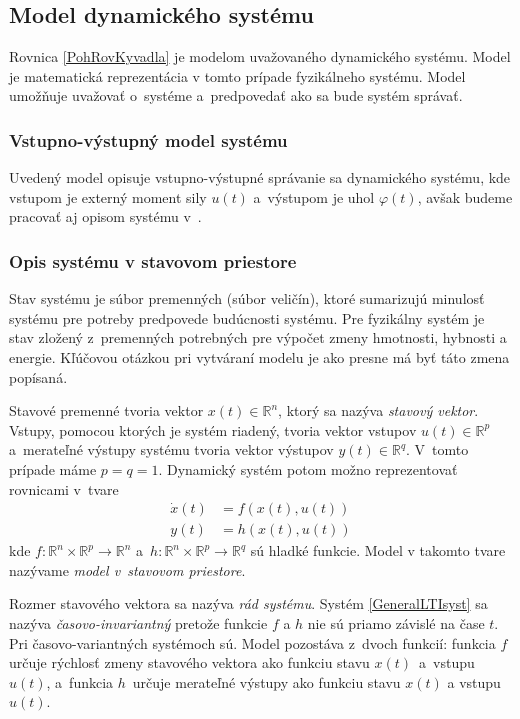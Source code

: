 \documentclass[a4paper, 10pt, ]{article}
\begin{document}
\subsection{Model dynamického systému}

Rovnica \eqref{PohRovKyvadla} je modelom uvažovaného dynamického systému. Model je matematická reprezentácia v tomto prípade fyzikálneho systému. Model umožňuje uvažovať o~systéme a~predpovedať ako sa bude systém správať.

\subsubsection{Vstupno-výstupný model systému}
    
Uvedený model opisuje vstupno-výstupné správanie sa dynamického systému, kde vstupom je externý moment sily $u(t)$ a~výstupom je uhol $\varphi(t)$, avšak budeme pracovať aj opisom systému v~.


\subsubsection{Opis systému v stavovom priestore}

Stav systému je súbor premenných (súbor veličín), ktoré sumarizujú minulosť systému pre potreby predpovede budúcnosti systému. Pre fyzikálny systém je stav zložený z~premenných potrebných pre výpočet zmeny hmotnosti, hybnosti a energie. Kľúčovou otázkou pri vytváraní modelu je ako presne má byť táto zmena popísaná.

Stavové premenné tvoria vektor $x(t) \in  \mathbb{R}^n$, ktorý sa nazýva \emph{stavový vektor}. Vstupy, pomocou ktorých je systém riadený, tvoria vektor vstupov $u(t) \in \mathbb{R}^p$ a~merateľné výstupy systému tvoria vektor výstupov $y(t) \in \mathbb{R}^q$. V~tomto prípade máme $p = q = 1$. Dynamický systém  potom možno reprezentovať rovnicami v~tvare
\begin{subequations} \label{GeneralLTIsyst}
\begin{align}
	\dot{x}(t) &= f(x(t),u(t)) \\
	y(t) &= h(x(t),u(t))
\end{align}
\end{subequations}
kde $f: \mathbb{R}^n \times \mathbb{R}^p \rightarrow \mathbb{R}^n$ a~$h: \mathbb{R}^n \times \mathbb{R}^p \rightarrow \mathbb{R}^q$ sú hladké funkcie. Model v takomto tvare nazývame \emph{model v~stavovom priestore}.

Rozmer stavového vektora sa nazýva \emph{rád systému}. Systém \eqref{GeneralLTIsyst} sa nazýva \emph{časovo-invariantný} pretože funkcie $f$ a $h$ nie sú priamo závislé na čase $t$. Pri časovo-variantných systémoch sú. Model pozostáva z~dvoch funkcií: funkcia $f$ určuje rýchlosť zmeny stavového vektora ako funkciu stavu $x(t)$~a~vstupu $u(t)$, a~funkcia $h$~určuje merateľné výstupy ako funkciu stavu $x(t)$ a vstupu $u(t)$.
\end{document}
